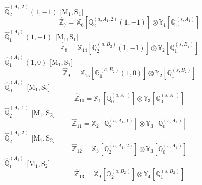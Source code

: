 \documentclass[fleqn,10pt,landscape]{article}
\begin{document}
\begin{itemize}
\vspace{4mm}
\noindent {} $\,\,\,\hat{\mathbb{Q}}_{2}^{(A_{1},2)}(1,-1)$ [M$_{1}$,\,S$_{1}$]
\begin{dmath*}
\hat{\mathbb{Z}}_{7}=\mathbb{X}_{6}[\mathbb{Q}_{2}^{(a,A_{1},2)}(1,-1)] \otimes\mathbb{Y}_{1}[\mathbb{Q}_{0}^{(s,A_{1})}]
\end{dmath*}
\vspace{4mm}
\noindent {} $\,\,\,\hat{\mathbb{Q}}_{1}^{(A_{1})}(1,-1)$ [M$_{1}$,\,S$_{1}$]
\begin{dmath*}
\hat{\mathbb{Z}}_{8}=\mathbb{X}_{14}[\mathbb{Q}_{2}^{(a,B_{2})}(1,-1)] \otimes\mathbb{Y}_{2}[\mathbb{Q}_{1}^{(s,B_{2})}]
\end{dmath*}
\vspace{4mm}
\noindent {} $\,\,\,\hat{\mathbb{Q}}_{1}^{(A_{1})}(1,0)$ [M$_{1}$,\,S$_{1}$]
\begin{dmath*}
\hat{\mathbb{Z}}_{9}=\mathbb{X}_{15}[\mathbb{G}_{1}^{(a,B_{2})}(1,0)] \otimes\mathbb{Y}_{2}[\mathbb{Q}_{1}^{(s,B_{2})}]
\end{dmath*}
\vspace{4mm}
\noindent {} $\,\,\,\hat{\mathbb{Q}}_{0}^{(A_{1})}$ [M$_{1}$,\,S$_{2}$]
\begin{dmath*}
\hat{\mathbb{Z}}_{10}=\mathbb{X}_{1}[\mathbb{Q}_{0}^{(a,A_{1})}] \otimes\mathbb{Y}_{3}[\mathbb{Q}_{0}^{(s,A_{1})}]
\end{dmath*}
\vspace{4mm}
\noindent {} $\,\,\,\hat{\mathbb{Q}}_{2}^{(A_{1},1)}$ [M$_{1}$,\,S$_{2}$]
\begin{dmath*}
\hat{\mathbb{Z}}_{11}=\mathbb{X}_{2}[\mathbb{Q}_{2}^{(a,A_{1},1)}] \otimes\mathbb{Y}_{3}[\mathbb{Q}_{0}^{(s,A_{1})}]
\end{dmath*}
\vspace{4mm}
\noindent {} $\,\,\,\hat{\mathbb{Q}}_{2}^{(A_{1},2)}$ [M$_{1}$,\,S$_{2}$]
\begin{dmath*}
\hat{\mathbb{Z}}_{12}=\mathbb{X}_{3}[\mathbb{Q}_{2}^{(a,A_{1},2)}] \otimes\mathbb{Y}_{3}[\mathbb{Q}_{0}^{(s,A_{1})}]
\end{dmath*}
\vspace{4mm}
\noindent {} $\,\,\,\hat{\mathbb{Q}}_{1}^{(A_{1})}$ [M$_{1}$,\,S$_{2}$]
\begin{dmath*}
\hat{\mathbb{Z}}_{13}=\mathbb{X}_{9}[\mathbb{Q}_{2}^{(a,B_{2})}] \otimes\mathbb{Y}_{4}[\mathbb{Q}_{1}^{(s,B_{2})}]
\end{dmath*}
\vspace{4mm}

\end{itemize}
\end{document}
